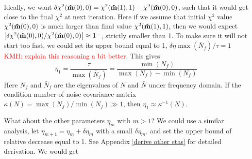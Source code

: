 \documentclass[twocolumn,linenumbers]{aastex631}
\newcommand{\vbd}{\vb{d}}
\newcommand{\inv}[1]{#1^{-1}}
\newcommand{\hatm}{\vb{\hat{m}}}
\newcommand{\Nbar}{\bar{N}}
\newcommand{\kmh}[1]{\textcolor{red}{KMH: #1}}
\begin{document}
Ideally, we want
$\delta \chi^2(\hatm(0),0) = \chi^2(\hatm(1), 1) - \chi^2(\hatm(0),0)$,
such that it would get close to the final $\chi^2$ at next iteration.
Here if we assume that initial $\chi^2$ value $\chi^2(\hatm(0),0)$ is much
larger than final value $\chi^2(\hatm(1),1)$,
then we would expect
$\qty|\delta\chi^2(\hatm(0),0)/\chi^2(\hatm(0),0)| \approx 1^-$,
strictly smaller than 1.
To make sure it will not start too fast, 
we could set its upper bound equal to 1, $\delta \eta \max(\Nbar_f) / \tau = 1$ \kmh{explain this reasoning a bit better}.
This gives
\begin{equation}
\eta_1 = \frac{\tau}{\max(\Nbar_f)} = \frac{\min(N_f)}{\max(N_f) - \min(N_f)}
\end{equation}
Here $N_f$ and $\Nbar_f$ are the eigenvalues of $N$ and $\Nbar$ under frequency
domain.
If the condition number of noise covariance matrix
$\kappa(N) = \max(N_f)/\min(N_f) \gg 1$,
then $\eta_1 \approx \inv{\kappa} (N)$.

What about the other parameters $\eta_m$ with $m > 1$?
We could use a similar analysis,
let $\eta_{m+1} = \eta_m + \delta \eta_m$ with a small $\delta\eta_m$,
and set the upper bound of relative decrease equal to 1.
See Appendix \ref{derive other etas} for detailed derivation.
We would get
\end{document}
